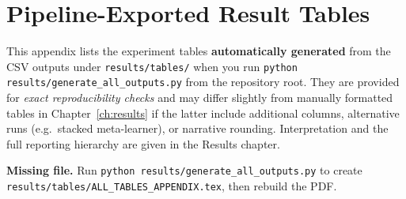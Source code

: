 \chapter{Pipeline-Exported Result Tables}
\label{app:pipeline_tables}

This appendix lists the experiment tables \textbf{automatically generated} from the CSV outputs under \texttt{results/tables/} when you run \texttt{python results/generate\_all\_outputs.py} from the repository root. They are provided for \emph{exact reproducibility checks} and may differ slightly from manually formatted tables in Chapter~\ref{ch:results} if the latter include additional columns, alternative runs (e.g.\ stacked meta-learner), or narrative rounding. Interpretation and the full reporting hierarchy are given in the Results chapter.

  {}
  {\par\textbf{Missing file.} Run \texttt{python results/generate\_all\_outputs.py} to create \texttt{results/tables/ALL\_TABLES\_APPENDIX.tex}, then rebuild the PDF.\par}
